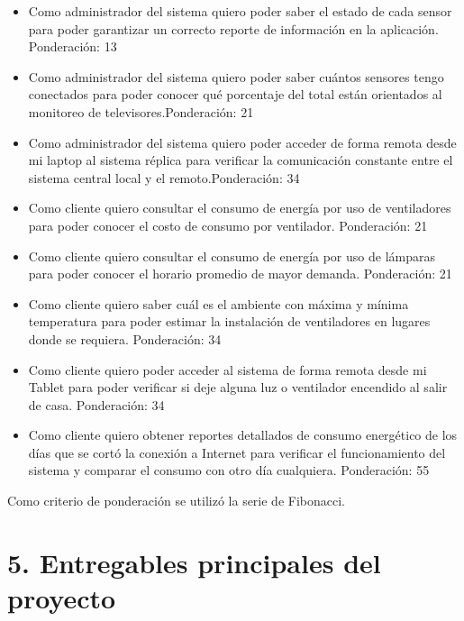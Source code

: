 \documentclass[11pt]{charter}
\begin{document}
\begin{itemize}
\item Como administrador del sistema quiero poder saber el estado de cada sensor para poder garantizar un correcto reporte de información en la aplicación.\newline
Ponderación: 13
\item Como administrador del sistema quiero poder saber cuántos sensores tengo conectados para poder conocer qué porcentaje del total están orientados al monitoreo de televisores.\newline Ponderación: 21
\item Como administrador del sistema quiero poder acceder de forma remota desde mi laptop al sistema réplica para verificar la comunicación constante entre el sistema central local y el remoto.\newline Ponderación: 34
\item Como cliente quiero consultar el consumo de energía por uso de ventiladores para poder conocer el costo de consumo por ventilador. \newline Ponderación: 21
\item Como cliente quiero consultar el consumo de energía por uso de lámparas para poder conocer el horario promedio de mayor demanda. \newline Ponderación: 21
\item Como cliente quiero saber cuál es el ambiente con máxima y mínima temperatura para poder estimar la instalación de ventiladores en lugares donde se requiera. \newline Ponderación: 34
\item Como cliente quiero poder acceder al sistema de forma remota desde mi Tablet para poder verificar si deje alguna luz o ventilador encendido al salir de casa. \newline Ponderación: 34
\item Como cliente quiero obtener reportes detallados de consumo energético de los días que se cortó la conexión a Internet para verificar el funcionamiento del sistema y comparar el consumo con otro día cualquiera. \newline Ponderación: 55
\end{itemize}

Como criterio de ponderación se utilizó la serie de Fibonacci.
\section{5. Entregables principales del proyecto}
\label{sec:entregables}
\end{document}
